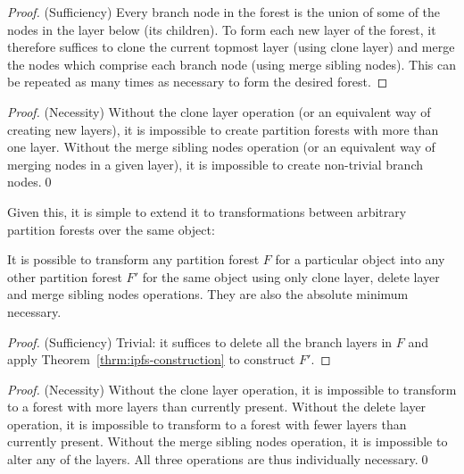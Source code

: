 \begin{proof}
(Sufficiency) Every branch node in the forest is the union of some of the nodes in the layer below (its children). To form each new layer of the forest, it therefore suffices to clone the current topmost layer (using clone layer) and merge the nodes which comprise each branch node (using merge sibling nodes). This can be repeated as many times as necessary to form the desired forest.
\end{proof}

\begin{proof}
(Necessity) Without the clone layer operation (or an equivalent way of creating new layers), it is impossible to create partition forests with more than one layer. Without the merge sibling nodes operation (or an equivalent way of merging nodes in a given layer), it is impossible to create non-trivial branch nodes.\qed
\end{proof}

\noindent Given this, it is simple to extend it to transformations between arbitrary partition forests over the same object:

\begin{theorem}
\label{thrm:ipfs-transformation}
It is possible to transform any partition forest $F$ for a particular object into any other partition forest $F'$ for the same object using only clone layer, delete layer and merge sibling nodes operations. They are also the absolute minimum necessary.
\end{theorem}

\begin{proof}
(Sufficiency) Trivial: it suffices to delete all the branch layers in $F$ and apply Theorem~\ref{thrm:ipfs-construction} to construct $F'$.
\end{proof}

\begin{proof}
(Necessity) Without the clone layer operation, it is impossible to transform to a forest with more layers than currently present. Without the delete layer operation, it is impossible to transform to a forest with fewer layers than currently present. Without the merge sibling nodes operation, it is impossible to alter any of the layers. All three operations are thus individually necessary.\qed
\end{proof}

